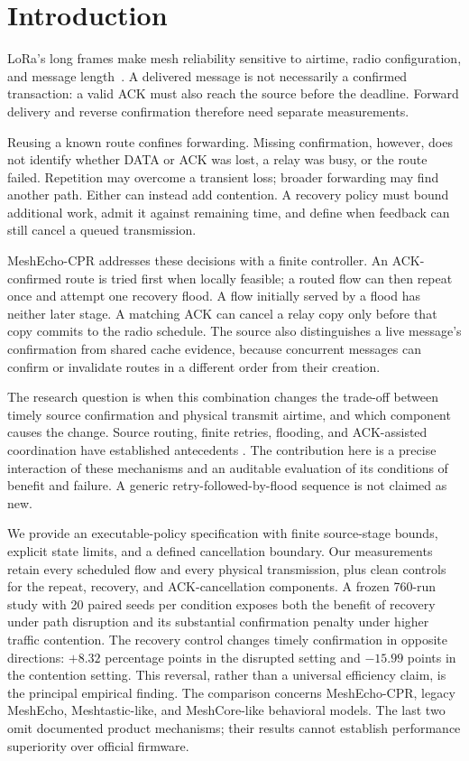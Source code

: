 \section{Introduction}
\label{sec:introduction}

LoRa's long frames make mesh reliability sensitive to airtime,
radio configuration, and message length~\cite{augustin2016study,bor2016scale}.
A delivered message is not necessarily a confirmed transaction: a valid
ACK must also reach the source before the deadline. Forward delivery
and reverse confirmation therefore need separate measurements.

Reusing a known route confines forwarding. Missing confirmation, however,
does not identify whether DATA or ACK was lost, a relay was busy, or the
route failed. Repetition may overcome a transient loss; broader
forwarding may find another path. Either can instead add contention.
A recovery policy must bound additional work, admit it against remaining
time, and define when feedback can still cancel a queued transmission.

MeshEcho-CPR addresses these decisions with a finite controller. An
ACK-confirmed route is tried first when locally feasible; a routed flow
can then repeat once and attempt one recovery flood. A flow initially
served by a flood has neither later stage. A matching ACK can cancel a
relay copy only before that copy commits to the radio schedule. The source
also distinguishes a live message's confirmation from shared cache
evidence, because concurrent messages can confirm or invalidate routes
in a different order from their creation.

The research question is when this combination changes the trade-off
between timely source confirmation and physical transmit airtime, and
which component causes the change. Source routing, finite retries,
flooding, and ACK-assisted coordination have established antecedents
\cite{johnson1996dsr,liu2004truncated,biswas2005exor}. The contribution
here is a precise interaction of these mechanisms and an auditable
evaluation of its conditions of benefit and failure. A generic
retry-followed-by-flood sequence is not claimed as new.

We provide an executable-policy specification with
finite source-stage bounds, explicit state limits, and a defined
cancellation boundary. Our measurements retain every
scheduled flow and every physical transmission, plus clean controls for
the repeat, recovery, and ACK-cancellation components. A frozen 760-run
study with 20 paired seeds per condition exposes both the benefit of
recovery under path disruption and its substantial confirmation penalty
under higher traffic contention. The recovery control changes timely
confirmation in opposite directions: $+8.32$ percentage points in the
disrupted setting and $-15.99$ points in the contention setting. This
reversal, rather than a universal efficiency claim, is the principal
empirical finding.
The comparison concerns MeshEcho-CPR, legacy MeshEcho, Meshtastic-like,
and MeshCore-like behavioral models. The last two omit documented
product mechanisms; their results cannot establish performance superiority
over official firmware.
